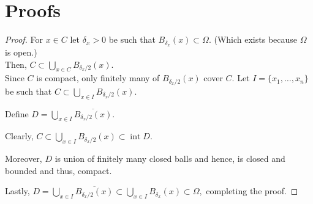 \chapter{Proofs}

\compcover*\label{lem:compcover2}
\begin{flushright}\hyperref[lem:compcover]{\upsym}\end{flushright}
\begin{proof}
	For $x \in C$ let $\delta_x > 0$ be such that $B_{\delta_x}(x) \subset \Omega.$ (Which exists because $\Omega$ is open.)\\
	Then, $C \subset \displaystyle\bigcup_{x \in C}B_{\delta_x/2}(x).$\\
	Since $C$ is compact, only finitely many of $B_{\delta_x/2}(x)$ cover $C.$ Let $I = \{x_1, \ldots, x_n\}$ be such that $C \subset \displaystyle\bigcup_{x \in I}B_{\delta_x/2}(x).$

	Define $D =\displaystyle\bigcup_{x \in I}\overline{B_{\delta_x/2}(x) }.$

	Clearly, $C \subset  \displaystyle\bigcup_{x \in I}B_{\delta_x/2}(x) \subset \operatorname{int} D.$

	Moreover, $D$ is union of finitely many closed balls and hence, is closed and bounded and thus, compact.

	Lastly, $D = \displaystyle\bigcup_{x \in I}\overline{B_{\delta_x/2}(x)} \subset \displaystyle\bigcup_{x \in I}B_{\delta_x}(x) \subset \Omega,$ completing the proof.
\end{proof}

